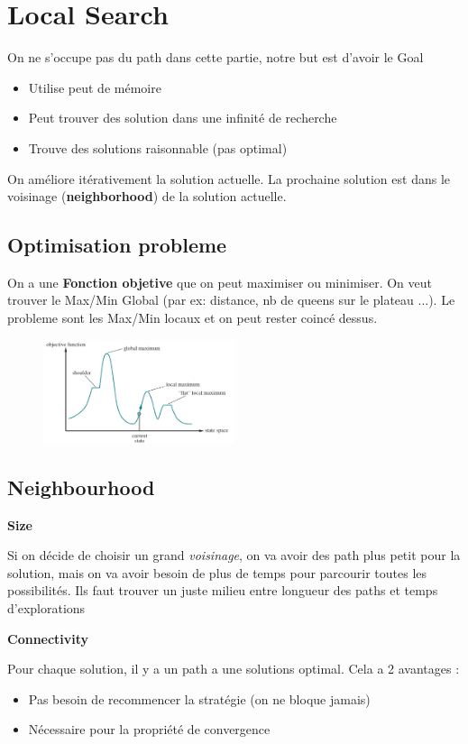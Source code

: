 \section{Local Search}
	On ne s'occupe pas du path dans cette partie, notre but est d'avoir le Goal
	\begin{itemize}
		\item Utilise peut de mémoire
		\item Peut trouver des solution dans une infinité de recherche
		\item Trouve des solutions raisonnable (pas optimal)
	\end{itemize}
	
	On améliore itérativement la solution actuelle. La prochaine solution est dans le voisinage (\textbf{neighborhood}) de la solution actuelle.
	
	\subsection{Optimisation probleme}
		On a une \textbf{Fonction objetive} que on peut maximiser ou minimiser. On veut trouver le Max/Min Global (par ex: distance, nb de queens sur le plateau ...). Le probleme sont les Max/Min locaux et on peut rester coincé dessus.
		
		\begin{figure}[htp]
			\centering
			\includegraphics[width=0.5\textwidth]{img/LocalOptiProbleme.png}
		\end{figure}
	\subsection{Neighbourhood}
	
		\textbf{Size}		
	
		Si on décide de choisir un grand \textit{voisinage}, on va avoir des path plus petit pour la solution, mais on va avoir besoin de plus de temps pour parcourir toutes les possibilités. Ils faut trouver un juste milieu entre longueur des paths et temps d'explorations
		
		\textbf{Connectivity}
		
		Pour chaque solution, il y a un path a une solutions optimal. Cela a 2 avantages :
		\begin{itemize}
			\item Pas besoin de recommencer la stratégie (on ne bloque jamais)
			\item Nécessaire pour la propriété de convergence
		\end{itemize}


